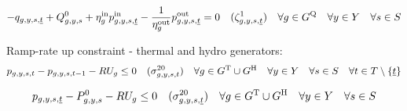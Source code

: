 \documentclass{article}
\begin{document}
\begin{equation}
	- \vStorageUnitEnergy[\iGenerator,\iYear,\iScenario,\iIntervalStart] + \cStorageEnergyInitial + \cStorageUnitEfficiencyCharging \vPowerIn[\iGenerator,\iYear,\iScenario,\iIntervalStart] - \frac{1}{\cStorageUnitEfficiencyDischarging} \vPowerOut[\iGenerator,\iYear,\iScenario,\iIntervalStart] = 0 \quad (\dStorageEnergyTransition[\iGenerator,\iYear,\iScenario,\iIntervalStart]) \quad \forall \iGenerator \in \sStorage \quad \forall \iYear \in \sYears \quad \forall \iScenario \in \sScenarios
\end{equation}

Ramp-rate up constraint - thermal and hydro generators:
\begin{equation}
	\vPower - \vPower[\iGenerator,\iYear,\iScenario,\iInterval-1] - \cRampRateUp \leq 0 \quad (\dRampRateUp) \quad \forall \iGenerator \in \sGeneratorsThermal \cup \sGeneratorsHydro \quad \forall \iYear \in \sYears \quad \forall \iScenario \in \sScenarios \quad \forall \iInterval \in \sIntervals \setminus \{\iIntervalStart\}
\end{equation}

\begin{equation}
	\vPower[\iGenerator,\iYear,\iScenario,\iIntervalStart] - \cPowerInitial - \cRampRateUp \leq 0 \quad (\dRampRateUp[\iGenerator,\iYear,\iScenario,\iIntervalStart]) \quad \forall \iGenerator \in \sGeneratorsThermal \cup \sGeneratorsHydro \quad \forall \iYear \in \sYears \quad \forall \iScenario \in \sScenarios
\end{equation}
\end{document}
